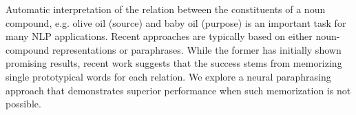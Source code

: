 Automatic interpretation of the relation between the constituents of a noun compound, e.g. olive oil (source) and baby oil (purpose) is an important task for many NLP applications. Recent approaches are typically based on either noun-compound representations or paraphrases. While the former has initially shown promising results, recent work suggests that the success stems from memorizing single prototypical words for each relation. We explore a neural paraphrasing approach that demonstrates superior performance when such memorization is not possible.
